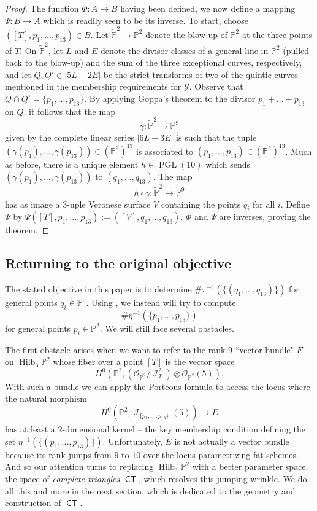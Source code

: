 \documentclass[reqno, 11pt]{amsart}
\theoremstyle{plain}
\theoremstyle{remark}
\renewcommand{\P}{\mathbb{P}}
\DeclareMathOperator{\PGL}{PGL}
\DeclareMathOperator{\Hilb}{Hilb}
\DeclareMathOperator{\I}{\mathcal{I}}
\renewcommand{\O}{\mathcal{O}}
\DeclareMathOperator{\CT}{\mathsf{CT}}
\begin{document}
\begin{proof}
    The function $\Phi: A \to B$ having been defined, we now define a mapping $\Psi: B \to A$ which is readily seen to be its inverse.  To start, choose $([T],p_{1}, \dots, p_{13}) \in B$. Let $\widetilde{\P}^{2} \to \P^{2}$ denote the blow-up of $\P^{2}$ at the three points of $T$.  On $\widetilde{\P}^{2}$, let $L$ and $E$ denote the divisor classes of a general line in $\P^{2}$ (pulled back to the blow-up) and the sum of the three exceptional curves, respectively, and let $Q,Q' \in |5L-2E|$ be the strict transforms of two of the quintic curves mentioned in the membership requirements for $\mathcal{Y}$.  Observe that $Q\cap Q' = \{p_{1}, \dots, p_{13}\}$. By applying Goppa's theorem to the divisor $p_{1}+ \dots + p_{13}$ on $Q$, it follows that the map $$\gamma: \widetilde{\P}^{2} \to \P^{9}$$ given by the complete linear series $|6L-3E|$ is such that the tuple $(\gamma(p_{1}), \dots, \gamma(p_{13})) \in (\P^{9})^{13}$ is associated to $(p_{1}, \dots, p_{13}) \in (\P^{2})^{13}$.  Much as before, there is a unique element $h \in \PGL(10)$ which sends $(\gamma(p_{1}), \dots, \gamma(p_{13}))$ to $(q_{1}, \dots, q_{13})$. The map $$h \circ \gamma: \widetilde{\P}^{2} \to \P^{9}$$ has as image a $3$-uple Veronese surface $V$ containing the points $q_{i}$ for all $i$. Define $\Psi$ by $\Psi([T],p_{1},\dots, p_{13}) := ([V],q_{1}, \dots, q_{13}).$   $\Phi$ and $\Psi$ are inverses, proving the theorem.
\end{proof}

\subsection{Returning to the original objective}
\label{subsec:returning}
The stated objective in this paper is to determine $\#\pi^{-1}(\{(q_{1}, \dots, q_{13})\})$ for general points $q_{i} \in \P^{9}$.  Using , we instead will try to compute $$\#\eta^{-1}(\{p_{1}, \dots, p_{13}\})$$ for general points $p_{i} \in \P^{2}$.  We will still face several obstacles.

The first obstacle arises when we want to refer to the rank $9$ ``vector bundle" $E$ on $\Hilb_{3}\P^{2}$ whose fiber over a point $[T]$ is the vector space $$H^{0}\left(\P^{2}, \left(\O_{\P^{2}}/ \I_{T}^{2}\right)\otimes \O_{\P^{2}}(5)\right).$$  With such a bundle we can apply the Porteous formula to access the locus where the natural morphism $$\underline{H^{0}\left(\P^{2},\I_{\{p_{1}, \dots, p_{13}\}}(5)\right)} \to E$$ has at least a $2$-dimensional kernel -- the key membership condition defining the set $\eta^{-1}(\{(p_{1}, \dots, p_{13})\})$. Unfortunately, $E$ is not actually a vector bundle because its rank jumps from $9$ to $10$ over the locus parametrizing fat schemes.  And so our attention turns to replacing $\Hilb_{3}\P^{2}$ with a better parameter space, the space of {\sl complete triangles} $\CT$, which resolves this jumping wrinkle.  We do all this and more in the next section, which is dedicated to the geometry and construction of $\CT$.
\end{document}
